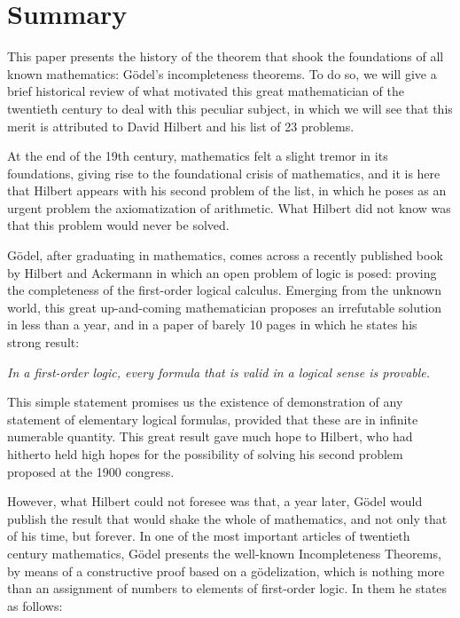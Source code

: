 %

\chapter{Summary}

This paper presents the history of the theorem that shook the foundations of all known mathematics: Gödel's incompleteness theorems. 
To do so, we will give a brief historical review of what motivated this great mathematician of the twentieth century to deal with this 
peculiar subject, in which we will see that this merit is attributed to David Hilbert and his list of 23 problems. 

At the end of the 19th century, mathematics felt a slight tremor in its foundations, giving rise to the foundational crisis of mathematics, 
and it is here that Hilbert appears with his second problem of the list, in which he poses as an urgent problem the axiomatization of arithmetic. 
What Hilbert did not know was that this problem would never be solved. 

Gödel, after graduating in mathematics, comes across a recently published book by Hilbert and Ackermann in which an open problem of logic is posed: 
proving the completeness of the first-order logical calculus. Emerging from the unknown world, this great up-and-coming mathematician proposes 
an irrefutable solution in less than a year, and in a paper of barely 10 pages in which he states his strong result: 

\begin{center}
    \textit{In a first-order logic, every formula that is valid in a logical sense is provable.}
\end{center}
 
This simple statement promises us the existence of demonstration of any statement of elementary logical formulas, provided that these are in 
infinite numerable quantity. This great result gave much hope to Hilbert, who had hitherto held high hopes for the possibility of solving his 
second problem proposed at the 1900 congress. 

However, what Hilbert could not foresee was that, a year later, Gödel would publish the result that would shake the whole of mathematics, 
and not only that of his time, but forever. In one of the most important articles of twentieth century mathematics, Gödel presents the well-known 
Incompleteness Theorems, by means of a constructive proof based on a gödelization, which is nothing more than an assignment of numbers to 
elements of first-order logic. In them he states as follows:

